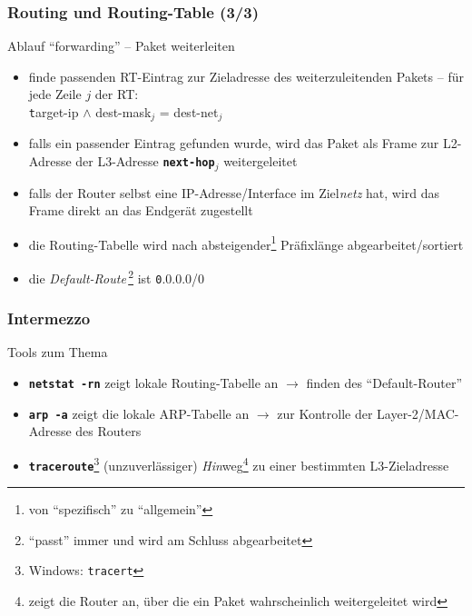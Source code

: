 \documentclass[ignorenonframetext]{beamer}
\begin{document}
\begin{frame}
\frametitle{Routing und Routing-Table (3/3)}

Ablauf ``forwarding'' -- Paket weiterleiten

\begin{itemize}
  \item{finde passenden RT-Eintrag zur Zieladresse des weiterzuleitenden Pakets -- f\"ur jede Zeile \texttt{$j$} der RT:
    \\ {\texttt target-ip \textbf{$\wedge$} dest-mask$_{j}$ = dest-net$_{j}$}}
  \item{falls ein passender Eintrag gefunden wurde, wird das Paket als Frame zur L2-Adresse der L3-Adresse \textbf{\texttt{next-hop$_{j}$}} weitergeleitet}
  \item{falls der Router selbst eine IP-Adresse/Interface im Ziel{\em netz} hat, wird das Frame direkt an das Endger\"at zugestellt}
	\item{die Routing-Tabelle wird nach absteigender\footnote{von ``spezifisch'' zu ``allgemein''} Pr\"afixl\"ange abgearbeitet/sortiert}
	\item{die {\em Default-Route}\,\footnote{``passt'' immer und wird am Schluss abgearbeitet} ist {\texttt 0.0.0.0/0}}
\end{itemize}
\end{frame}

\begin{frame}
\frametitle{Intermezzo}
Tools zum Thema
\begin{itemize}
	\item{\textbf{\texttt{netstat -rn}} zeigt lokale Routing-Tabelle an $\rightarrow$ finden des ``Default-Router''}
	\item{\textbf{\texttt{arp -a}} zeigt die lokale ARP-Tabelle an $\rightarrow$ zur Kontrolle der Layer-2/MAC-Adresse des Routers}
	\item{\textbf{\texttt{traceroute}}\footnote{Windows: \texttt{tracert}} (unzuverl\"assiger) {\em Hin}weg\footnote{zeigt die Router an, \"uber die ein Paket wahrscheinlich weitergeleitet wird} zu einer bestimmten L3-Zieladresse}
\end{itemize}
\end{frame}


\end{document}
